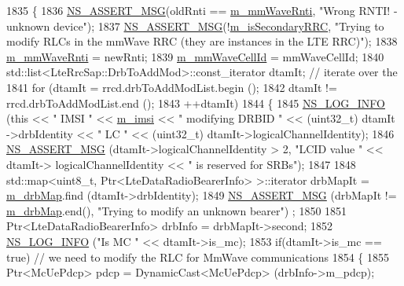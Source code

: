 \begin{DoxyCode}
1835 \{
1836   \hyperlink{assert_8h_aff5ece9066c74e681e74999856f08539}{NS\_ASSERT\_MSG}(oldRnti == \hyperlink{classns3_1_1LteUeRrc_a0bd0d5c3b49624be1fd217f96910f56a}{m\_mmWaveRnti}, \textcolor{stringliteral}{"Wrong RNTI! - unknown device"});
1837   \hyperlink{assert_8h_aff5ece9066c74e681e74999856f08539}{NS\_ASSERT\_MSG}(!\hyperlink{classns3_1_1LteUeRrc_a00a3ffa4dd31c1ab66921a9a019f5586}{m\_isSecondaryRRC}, \textcolor{stringliteral}{"Trying to modify RLCs in the mmWave RRC
       (they are instances in the LTE RRC)"});
1838   \hyperlink{classns3_1_1LteUeRrc_a0bd0d5c3b49624be1fd217f96910f56a}{m\_mmWaveRnti} = newRnti;
1839   \hyperlink{classns3_1_1LteUeRrc_a28b83564a465159f0cf6d75d4b48d7eb}{m\_mmWaveCellId} = mmWaveCellId;
1840   std::list<LteRrcSap::DrbToAddMod>::const\_iterator dtamIt; \textcolor{comment}{// iterate over the }
1841   \textcolor{keywordflow}{for} (dtamIt = rrcd.drbToAddModList.begin ();
1842        dtamIt != rrcd.drbToAddModList.end ();
1843        ++dtamIt)
1844     \{
1845       \hyperlink{group__logging_gafbd73ee2cf9f26b319f49086d8e860fb}{NS\_LOG\_INFO} (\textcolor{keyword}{this} << \textcolor{stringliteral}{" IMSI "} << \hyperlink{classns3_1_1LteUeRrc_a1d825677309d17bdf729920f7dafd011}{m\_imsi} << \textcolor{stringliteral}{" modifying DRBID "} << (uint32\_t) dtamIt
      ->drbIdentity << \textcolor{stringliteral}{" LC "} << (uint32\_t) dtamIt->logicalChannelIdentity);
1846       \hyperlink{assert_8h_aff5ece9066c74e681e74999856f08539}{NS\_ASSERT\_MSG} (dtamIt->logicalChannelIdentity > 2, \textcolor{stringliteral}{"LCID value "} << dtamIt->
      logicalChannelIdentity << \textcolor{stringliteral}{" is reserved for SRBs"});
1847 
1848       std::map<uint8\_t, Ptr<LteDataRadioBearerInfo> >::iterator drbMapIt = 
      \hyperlink{classns3_1_1LteUeRrc_aa85c5bdde73c2072b2b3053e629bdce0}{m\_drbMap}.find (dtamIt->drbIdentity);
1849       \hyperlink{assert_8h_aff5ece9066c74e681e74999856f08539}{NS\_ASSERT\_MSG} (drbMapIt != \hyperlink{classns3_1_1LteUeRrc_aa85c5bdde73c2072b2b3053e629bdce0}{m\_drbMap}.end(), \textcolor{stringliteral}{"Trying to modify an unknown bearer"})
      ;
1850         
1851       Ptr<LteDataRadioBearerInfo> drbInfo = drbMapIt->second;
1852       \hyperlink{group__logging_gafbd73ee2cf9f26b319f49086d8e860fb}{NS\_LOG\_INFO} (\textcolor{stringliteral}{"Is MC "} << dtamIt->is\_mc);
1853       \textcolor{keywordflow}{if}(dtamIt->is\_mc == \textcolor{keyword}{true}) \textcolor{comment}{// we need to modify the RLC for MmWave communications}
1854       \{
1855         Ptr<McUePdcp> pdcp = DynamicCast<McUePdcp> (drbInfo->m\_pdcp);

\end{DoxyCode}
